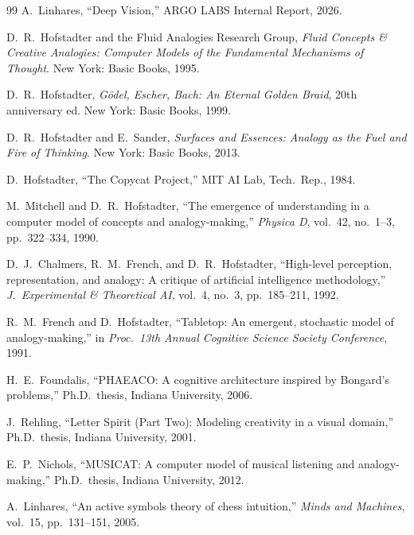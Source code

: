 \documentclass[11pt]{article}
\theoremstyle{definition}
\theoremstyle{remark}
\begin{document}
\begin{thebibliography}{99}
A.~Linhares,
``Deep Vision,''
ARGO LABS Internal Report, 2026.

D.~R.~Hofstadter and the Fluid Analogies Research Group, \emph{Fluid Concepts \& Creative Analogies: Computer Models of the Fundamental Mechanisms of Thought}. New York: Basic Books, 1995.

D.~R.~Hofstadter, \emph{G\"odel, Escher, Bach: An Eternal Golden Braid}, 20th anniversary ed. New York: Basic Books, 1999.

D.~R.~Hofstadter and E.~Sander, \emph{Surfaces and Essences: Analogy as the Fuel and Fire of Thinking}. New York: Basic Books, 2013.

D.~Hofstadter, ``The Copycat Project,'' MIT AI Lab, Tech.\ Rep., 1984.

M.~Mitchell and D.~R.~Hofstadter, ``The emergence of understanding in a computer model of concepts and analogy-making,'' \emph{Physica D}, vol.~42, no.~1--3, pp.~322--334, 1990.

D.~J.~Chalmers, R.~M.~French, and D.~R.~Hofstadter, ``High-level perception, representation, and analogy: A critique of artificial intelligence methodology,'' \emph{J.\ Experimental \& Theoretical AI}, vol.~4, no.~3, pp.~185--211, 1992.

R.~M.~French and D.~Hofstadter, ``Tabletop: An emergent, stochastic model of analogy-making,'' in \emph{Proc.\ 13th Annual Cognitive Science Society Conference}, 1991.

H.~E.~Foundalis, ``PHAEACO: A cognitive architecture inspired by Bongard's problems,'' Ph.D.\ thesis, Indiana University, 2006.

J.~Rehling, ``Letter Spirit (Part Two): Modeling creativity in a visual domain,'' Ph.D.\ thesis, Indiana University, 2001.

E.~P.~Nichols, ``MUSICAT: A computer model of musical listening and analogy-making,'' Ph.D.\ thesis, Indiana University, 2012.

A.~Linhares, ``An active symbols theory of chess intuition,'' \emph{Minds and Machines}, vol.~15, pp.~131--151, 2005.


\end{thebibliography}
\end{document}
